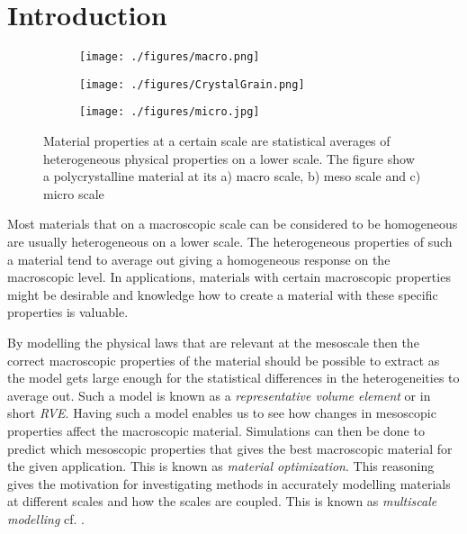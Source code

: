 \documentclass[introduction.tex]{subfiles}
\begin{document}
\chapter{Introduction}



 \begin{figure}
\centering

\begin{subfigure}{.1\textwidth}
  \centering
  \texttt{[image: ./figures/macro.png]}
  \caption{}
  \label{fig:macro}
\end{subfigure}
\scalebox{1.5}{$\boldsymbol{\longleftarrow}$}
\begin{subfigure}{.33\textwidth}
  \centering
  \texttt{[image: ./figures/CrystalGrain.png]}
  \caption{}
  \label{fig:meso}
\end{subfigure}%
\scalebox{1.5}{$\boldsymbol{\longleftarrow}$}
\begin{subfigure}{.33\textwidth}
  \centering
  \texttt{[image: ./figures/micro.jpg]}
  \caption{}
  \label{fig:micro}
\end{subfigure}
\caption{Material properties at a certain scale are statistical averages of heterogeneous physical properties on a lower scale. The figure show a polycrystalline material at its a) macro scale, b) meso scale\cite{wiki:grain} and c) micro scale\cite{Ozawa:ko5009}}
\label{micmacmes}
\end{figure}


Most materials that on a macroscopic scale can be considered to be homogeneous are usually heterogeneous on a lower scale. The heterogeneous properties of such a material tend to average out giving a homogeneous response on the macroscopic level. In applications, materials with certain macroscopic properties might be desirable and knowledge how to create a material with these specific properties is valuable. 

By modelling the physical laws that are relevant at the mesoscale then the correct macroscopic properties of the material should be possible to extract as the model gets large enough for the statistical differences in the heterogeneities to average out. Such a model is known as a \textit{representative volume element} or in short \textit{RVE}. Having such a model enables us to see how changes in mesoscopic properties affect the macroscopic material. Simulations can then be done to predict which mesoscopic properties that gives the best macroscopic material for the given application. This is known as \textit{material optimization}. This reasoning gives the motivation for investigating methods in accurately modelling materials at different scales and how the scales are coupled. This is known as \textit{multiscale modelling} cf. \cite{zohdi}.
\end{document}
